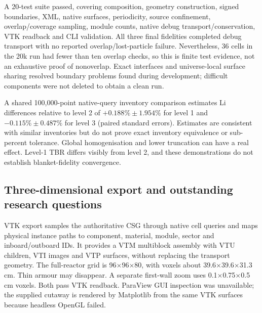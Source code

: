A 20-test suite passed, covering composition, geometry construction, signed boundaries, XML, native surfaces, periodicity, source confinement, overlap/coverage sampling, module counts, native debug transport/conservation, VTK readback and CLI validation. All three final fidelities completed debug transport with no reported overlap/lost-particle failure. Nevertheless, 36 cells in the 20k run had fewer than ten overlap checks, so this is finite test evidence, not an exhaustive proof of nonoverlap. Exact interfaces and universe-local surface sharing resolved boundary problems found during development; difficult components were not deleted to obtain a clean run.

A shared 100,000-point native-query inventory comparison estimates Li differences relative to level 2 of $+0.188\%\pm1.954\%$ for level 1 and $-0.115\%\pm0.487\%$ for level 3 (paired standard errors). Estimates are consistent with similar inventories but do not prove exact inventory equivalence or sub-percent tolerance. Global homogenisation and lower truncation can have a real effect. Level-1 TBR differs visibly from level 2, and these demonstrations do not establish blanket-fidelity convergence.


\subsection{Three-dimensional export and outstanding research questions}
VTK export samples the authoritative CSG through native cell queries and maps physical instance paths to component, material, module, sector and inboard/outboard IDs. It provides a VTM multiblock assembly with VTU children, VTI images and VTP surfaces, without replacing the transport geometry. The full-reactor grid is 96$\times$96$\times$80, with voxels about 39.6$\times$39.6$\times$31.3 cm. Thin armour may disappear. A separate first-wall zoom uses 0.1$\times$0.75$\times$0.5 cm voxels. Both pass VTK readback. ParaView GUI inspection was unavailable; the supplied cutaway is rendered by Matplotlib from the same VTK surfaces because headless OpenGL failed.

